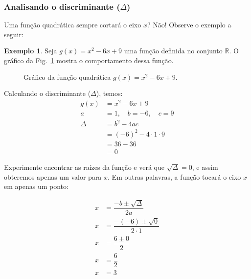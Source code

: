 \documentclass[12pt,openright,twoside,a4paper]{article}
\theoremstyle{definition}
\newtheorem{example}{Exemplo}[section]
\begin{document}
	\subsubsection{Analisando o discriminante ($\Delta$)}
	
	Uma função quadrática sempre cortará o eixo $x$? Não! Observe o exemplo a seguir:
	
	\begin{example}
		Seja $g(x) = x^2 - 6x + 9$ uma função definida no conjunto $\mathbb{R}$.
		O gráfico da Fig.~\ref{fig:funcao_quadratica} mostra o comportamento dessa função.
		\begin{figure}[h]
			\centering
			\caption{Gráfico da função quadrática $g(x) = x^2 - 6x + 9$.}
			\label{fig:funcao_quadratica}
		\end{figure}
		
		Calculando o discriminante ($\Delta$), temos:
		\begin{align*}
			g(x) &= x^2 - 6x + 9 \\
			a &= 1, \quad b = -6, \quad c = 9 \\
			\Delta &= b^2 - 4ac \\
			&= (-6)^2 - 4 \cdot 1 \cdot 9 \\
			&= 36 - 36 \\
			&= 0
		\end{align*}
		
		Experimente encontrar as raízes da função e verá que $\sqrt{\Delta} = 0$, e assim obteremos apenas um valor para $x$. Em outras palavras, a função tocará o eixo $x$ em apenas um ponto:
		
		\begin{align*}
			x &= \dfrac{-b \pm \sqrt{\Delta}}{2a} \\
			x &= \dfrac{-(-6) \pm \sqrt{0}}{2 \cdot 1} \\
			x &= \dfrac{6 \pm 0}{2} \\
			x &= \dfrac{6}{2} \\
			x &= 3
		\end{align*}
		
	\end{example}
	
\end{document}
